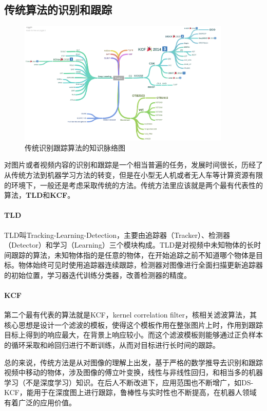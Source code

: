 \documentclass[lang=cn,11pt,a4paper]{eleganttemplate}
\begin{document}
\subsection{传统算法的识别和跟踪}
\begin{figure}[htbp]
  \centering
  \includegraphics[width=0.9\textwidth]{image/cv_1.png}
  \caption{传统识别跟踪算法的知识脉络图}
\end{figure}

对图片或者视频内容的识别和跟踪是一个相当普遍的任务，发展时间很长，历经了从传统方法到机器学习方法的转变，但是在小型无人机或者无人车等计算资源有限的环境下，一般还是考虑采取传统的方法。传统方法里应该就是两个最有代表性的算法，\textbf{TLD}和\textbf{KCF}。

\paragraph{TLD} TLD叫Tracking-Learning-Detection，主要由追踪器（Tracker）、检测器（Detector）和学习（Learning）三个模块构成。TLD是对视频中未知物体的长时间跟踪的算法，未知物体指的是任意的物体，在开始追踪之前不知道哪个物体是目标。物体始终可见时使用追踪器连续跟踪，检测器对图像进行全面扫描更新追踪器的初始位置，学习器迭代训练分类器，改善检测器的精度。

\paragraph{KCF} 第二个最有代表的算法就是KCF，kernel correlation filter，核相关滤波算法，其核心思想是设计一个滤波的模板，使得这个模板作用在整张图片上时，作用到跟踪目标上得到的响应最大，在背景上响应较小。而这个滤波模板则能够通过正负样本的循环采取和岭回归进行不断训练，从而对目标进行长时间的跟踪。
 
\hfill 
 
总的来说，传统方法是从对图像的理解上出发，基于严格的数学推导去识别和跟踪视频中移动的物体，涉及图像的傅立叶变换，线性与非线性回归，和相当多的机器学习（不是深度学习）知识。在后人不断改进下，应用范围也不断增广，如DS-KCF，能用于在深度图上进行跟踪，鲁棒性与实时性也不断提高，在机器人领域有着广泛的应用价值。
\end{document}
